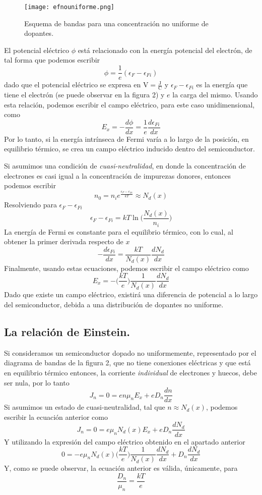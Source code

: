 \documentclass[12pt,a4paper]{article}
\begin{document}
\begin{figure}[ht!]
\begin{center}
\texttt{[image: efnouniforme.png]}
\caption{Esquema de bandas para una concentración no uniforme de dopantes.}
\end{center}
\end{figure}

El potencial eléctrico $\phi$ está relacionado con la energía potencial del electrón, de tal forma que podemos escribir
\[ \phi = \frac{1}{e}(\epsilon _{F} - \epsilon _{Fi}) \]
dado que el potencial eléctrico se expresa en V$=\frac{\textrm{J}}{\textrm{C}}$ y $\epsilon _{F} - \epsilon _{Fi}$ es la energía que tiene el electrón (se puede observar en la figura 2) y $e$ la carga del mismo. Usando esta relación, podemos escribir el campo eléctrico, para este caso unidimensional, como
\[ E_{x}=-\frac{d\phi}{dx}=\frac{1}{e} \frac{d\epsilon _{Fi}}{dx} \]
Por lo tanto, si la energía intrínseca de Fermi varía a lo largo de la posición, en equilibrio térmico, se crea un campo eléctrico inducido dentro del semiconductor.

Si asumimos una condición de \emph{cuasi-neutralidad}, en donde la concentración de electrones es casi igual a la concentración de impurezas donores, entonces podemos escribir
\[ n_{0}=n_{i} e^{\frac{\epsilon _{F} - \epsilon _{Fi}}{kT}} \approx N_{d}(x) \]
Resolviendo para $\epsilon _{F} - \epsilon _{Fi}$
\[ \epsilon _{F} - \epsilon _{Fi} = kT \ln \bigg( \frac{N_{d}(x)}{n_{i}} \bigg) \]
La energía de Fermi es constante para el equilibrio térmico, con lo cual, al obtener la primer derivada respecto de $x$
\[ -\frac{d\epsilon _{Fi}}{dx} = \frac{kT}{N_{d}(x)} \frac{dN_{d}}{dx} \]
Finalmente, usando estas ecuaciones, podemos escribir el campo eléctrico como
\[ E_{x} = -\bigg( \frac{kT}{e} \bigg) \frac{1}{N_{d}(x)} \frac{dN_{d}}{dx} \]
Dado que existe un campo eléctrico, existirá una diferencia de potencial a lo largo del semiconductor, debida a una distribución de dopantes no uniforme.

\subsection{La relación de Einstein.}

Si consideramos un semiconductor dopado no uniformemente, representado por el diagrama de bandas de la figura 2, que no tiene conexiones eléctricas y que está en equilibrio térmico entonces, la corriente \emph{individual} de electrones y huecos, debe ser nula, por lo tanto
\[ J_{n}=0=en\mu _{n}E_{x}+eD_{n} \frac{dn}{dx} \]
Si asumimos un estado de cuasi-neutralidad, tal que $n\approx N_{d}(x)$, podemos escribir la ecuación anterior como
\[ J_{n}=0= e\mu _{n} N_{d}(x)E_{x}+eD_{n}\frac{dN_{d}}{dx} \]
Y utilizando la expresión del campo eléctrico obtenido en el apartado anterior
\[ 0=-e\mu _{n}N_{d}(x) \bigg( \frac{kT}{e} \bigg) \frac{1}{N_{d}(x)} \frac{dN_{d}}{dx} + D_{n}\frac{dN_{d}}{dx} \]
Y, como se puede observar, la ecuación anterior es válida, únicamente, para
\[ \frac{D_{n}}{\mu _{n}} = \frac{kT}{e} \]
\end{document}
